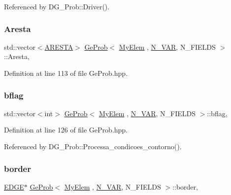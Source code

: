 Referenced by D\+G\+\_\+\+Prob\+::\+Driver().

\mbox{\label{classGeProb_af82bffefd5e8fe33dec7ef5b8098a9b4}} 
\subsubsection{\texorpdfstring{Aresta}{Aresta}}
{\footnotesize\ttfamily std\+::vector$<$\hyperlink{structARESTA}{A\+R\+E\+S\+TA}$>$ \hyperlink{classGeProb}{Ge\+Prob}$<$ \hyperlink{DG__Prob_8h_a83cd887ced9a6587428f267e50cd4787}{My\+Elem} , \hyperlink{classED__Prob_a4e7d2ff1a8e435e336fb00c527224b5a}{N\+\_\+\+V\+AR}, N\+\_\+\+F\+I\+E\+L\+DS $>$\+::Aresta\hspace{0.3cm}{\ttfamily [protected]}, {\ttfamily [inherited]}}



Definition at line 113 of file Ge\+Prob.\+hpp.

\mbox{\label{classGeProb_a60d3ba92d41a0776cdb3869e9bfeff7e}} 
\subsubsection{\texorpdfstring{bflag}{bflag}}
{\footnotesize\ttfamily std\+::vector$<$int$>$ \hyperlink{classGeProb}{Ge\+Prob}$<$ \hyperlink{DG__Prob_8h_a83cd887ced9a6587428f267e50cd4787}{My\+Elem} , \hyperlink{classED__Prob_a4e7d2ff1a8e435e336fb00c527224b5a}{N\+\_\+\+V\+AR}, N\+\_\+\+F\+I\+E\+L\+DS $>$\+::bflag\hspace{0.3cm}{\ttfamily [protected]}, {\ttfamily [inherited]}}



Definition at line 126 of file Ge\+Prob.\+hpp.



Referenced by D\+G\+\_\+\+Prob\+::\+Processa\+\_\+condicoes\+\_\+contorno().

\mbox{\label{classGeProb_a6c144ac05b601c5d6141c711edaaa775}} 
\subsubsection{\texorpdfstring{border}{border}}
{\footnotesize\ttfamily \hyperlink{structEDGE}{E\+D\+GE}$\ast$ \hyperlink{classGeProb}{Ge\+Prob}$<$ \hyperlink{DG__Prob_8h_a83cd887ced9a6587428f267e50cd4787}{My\+Elem} , \hyperlink{classED__Prob_a4e7d2ff1a8e435e336fb00c527224b5a}{N\+\_\+\+V\+AR}, N\+\_\+\+F\+I\+E\+L\+DS $>$\+::border\hspace{0.3cm}{\ttfamily [protected]}, {\ttfamily [inherited]}}



